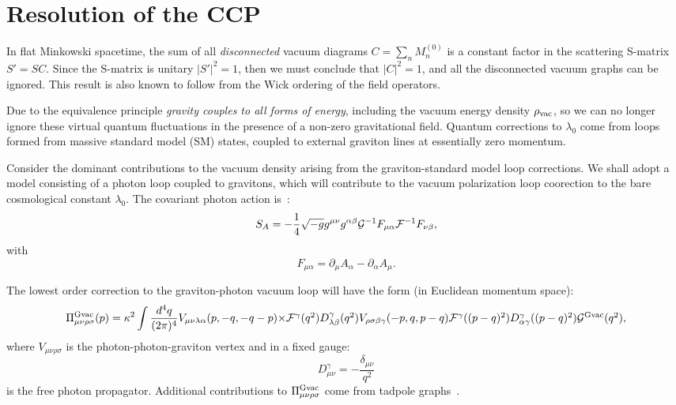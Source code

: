 \documentclass[a4paper,12pt]{article}
\begin{document}
\section{\bf Resolution of the CCP}

In flat Minkowski spacetime, the sum of all {\it disconnected}
vacuum diagrams $C=\sum_nM^{(0)}_n$ is a constant factor in the
scattering S-matrix $S'=SC$. Since the S-matrix is unitary
$\vert S'\vert^2=1$, then we must conclude that $\vert
C\vert^2=1$, and all the disconnected vacuum graphs can be
ignored. This result is also known to follow from the Wick ordering of the field
operators.

Due to the equivalence principle {\it gravity couples to all
forms of energy}, including the vacuum energy density $\rho_{\rm vac}$, so we can no
longer ignore these virtual quantum fluctuations in the presence of a non-zero
gravitational field. Quantum corrections to $\lambda_0$ come from
loops formed from massive standard model (SM) states, coupled to external
graviton lines at essentially zero momentum.

Consider the dominant contributions to the vacuum
density arising from the graviton-standard model loop corrections.
We shall adopt a model consisting of a photon loop coupled to
gravitons, which will contribute to the vacuum polarization loop coorection
to the bare cosmological constant $\lambda_0$. The covariant photon action
is~\cite{Leibbrandt}:
\begin{equation}
S_A=-\frac{1}{4}\sqrt{-g}g^{\mu\nu}g^{\alpha\beta}{\cal
G}^{-1}F_{\mu\alpha}{\cal F}^{-1}F_{\nu\beta},
\end{equation} with
\begin{equation}
F_{\mu\alpha}=\partial_\mu A_\alpha-\partial_\alpha A_\mu.
\end{equation}

The lowest order correction to the graviton-photon vacuum loop will have
the form (in Euclidean momentum space):
\begin{equation}
\Pi^{\rm Gvac}_{\mu\nu\rho\sigma}(p)
=\kappa^2\int\frac{d^4q}{(2\pi)^4}V_{\mu\nu\lambda\alpha}(p,-q,-q-p)
$$ $$
\times{\cal
F}^\gamma(q^2)D^\gamma_{\lambda\beta}(q^2)V_{\rho\sigma\beta\gamma}(-p,q,p-q)
{\cal F}^\gamma((p-q)^2)D^\gamma_{\alpha\gamma}((p-q)^2){\cal G}^{\rm
Gvac}(q^2), \end{equation}
where $V_{\mu\nu\rho\sigma}$ is the
photon-photon-graviton vertex and in a fixed gauge:
\begin{equation}
D^\gamma_{\mu\nu}=-\frac{\delta_{\mu\nu}}{q^2}
\end{equation}
is the free photon propagator. Additional contributions to
$\Pi^{\rm Gvac}_{\mu\nu\rho\sigma}$ come from tadpole
graphs~\cite{Leibbrandt}.
\end{document}
